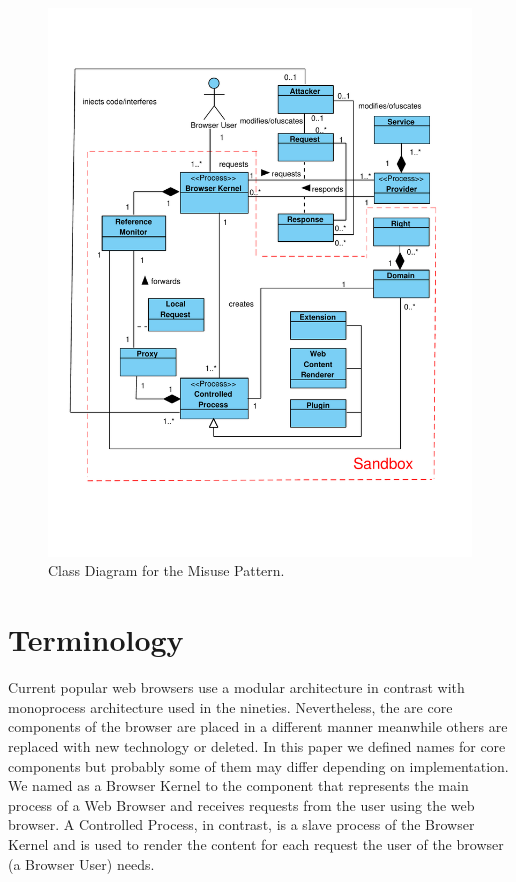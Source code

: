 \documentclass{sig-alternate-05-2015}
\begin{document}
\begin{figure}[h!t]
\vspace*{-2cm}
  \centering
  \includegraphics[scale=0.7]{figures/misuse/BrowserInfrastructureMisuse-v3.pdf}
  \vspace*{-2cm}
  \caption{Class Diagram for the Misuse Pattern.}
  \label{fig:BIMisuse}
\end{figure}

\section{Terminology}
Current popular web browsers use a modular architecture in contrast with monoprocess architecture used in the nineties. Nevertheless, the are core components of the browser are placed in a different manner meanwhile others are replaced with new technology or deleted. In this paper we defined names for core components but probably some of them may differ depending on implementation. We named as a Browser Kernel to the component that represents the main process of a Web Browser and receives requests from the user using the web browser. A Controlled Process, in contrast, is a slave process of the Browser Kernel and is used to render the content for each request the user of the browser (a Browser User) needs.
\end{document}
